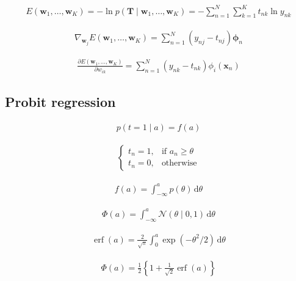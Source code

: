 \documentclass{article}
\begin{document}
\begin{align*}
E\left(\mathbf{w}_{1}, \ldots, \mathbf{w}_{K}\right)=-\ln p\left(\mathbf{T} \mid \mathbf{w}_{1}, \ldots, \mathbf{w}_{K}\right)=-\sum_{n=1}^{N} \sum_{k=1}^{K} t_{n k} \ln y_{n k}
\tag{5.80}
\end{align*}

\begin{align*}
\nabla_{\mathbf{w}_j} E\left(\mathbf{w}_1, \ldots, \mathbf{w}_K\right) = \sum_{n=1}^{N} \left( y_{n j} - t_{n j} \right) \boldsymbol{\phi}_n
\tag{5.81}
\end{align*}

\begin{align*}
\frac{\partial E\left(\mathbf{w}_1, \ldots, \mathbf{w}_K\right)}{\partial w_{i k}} = \sum_{n=1}^{N} \left( y_{n k} - t_{n k} \right) \phi_i\left(\mathbf{x}_n\right)
\tag{5.82}
\end{align*}

\subsection{Probit regression}

\begin{align*}
p(t=1 \mid a) = f(a)
\tag{5.83}
\end{align*}

\begin{align*}
\begin{cases}
t_n = 1, & \text{if } a_n \geqslant \theta \\
t_n = 0, & \text{otherwise}
\end{cases}
\tag{5.84}
\end{align*}

\begin{align*}
f(a) = \int_{-\infty}^{a} p(\theta) \, \mathrm{d} \theta
\tag{5.85}
\end{align*}

\begin{align*}
\Phi(a) = \int_{-\infty}^{a} \mathcal{N}(\theta \mid 0,1) \, \mathrm{d} \theta
\tag{5.86}
\end{align*}

\begin{align*}
\operatorname{erf}(a) = \frac{2}{\sqrt{\pi}} \int_0^a \exp\left( -\theta^2 / 2 \right) \, \mathrm{d} \theta
\tag{5.87}
\end{align*}

\begin{align*}
\Phi(a) = \frac{1}{2} \left\{ 1 + \frac{1}{\sqrt{2}} \operatorname{erf}(a) \right\}
\tag{5.88}
\end{align*}
\end{document}
